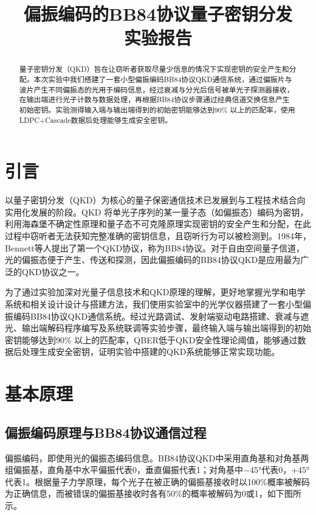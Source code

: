 \documentclass[UTF8]{ctexart}
\title{\vspace{-2em}\heiti 偏振编码的BB84协议量子密钥分发\\实验报告}
\date{}
\begin{document}
\maketitle

\begin{abstract}

量子密钥分发（QKD）旨在让窃听者获取尽量少信息的情况下实现密钥的安全产生和分配。本次实验中我们搭建了一套小型偏振编码BB84协议QKD通信系统，通过偏振片与波片产生不同偏振态的光用于编码信息，经过衰减与分光后信号被单光子探测器接收，在输出端进行光子计数与数据处理，再根据BB84协议步骤通过经典信道交换信息产生初始密钥。实验测得输入端与输出端得到的初始密钥能够达到90\% 以上的匹配率，使用LDPC+Cascade数据后处理能够生成安全密钥。

\end{abstract}

\section{引言}

以量子密钥分发（QKD）为核心的量子保密通信技术已发展到与工程技术结合向实用化发展的阶段。QKD 将单光子序列的某一量子态（如偏振态）编码为密钥，利用海森堡不确定性原理和量子态不可克隆原理实现密钥的安全产生和分配，在此过程中窃听者无法获知完整准确的密钥信息，且窃听行为可以被检测到。1984年，Bennett等人提出了第一个QKD协议，称为BB84协议。对于自由空间量子信道，光的偏振态便于产生、传送和探测，因此偏振编码的BB84协议QKD是应用最为广泛的QKD协议之一。

为了通过实验加深对光量子信息技术和QKD原理的理解，更好地掌握光学和电学系统和相关设计设计与搭建方法，我们使用实验室中的光学仪器搭建了一套小型偏振编码BB84协议QKD通信系统。经过光路调试、发射端驱动电路搭建、衰减与遮光、输出端解码程序编写及系统联调等实验步骤，最终输入端与输出端得到的初始密钥能够达到90\% 以上的匹配率，QBER低于QKD安全性理论阈值，能够通过数据后处理生成安全密钥，证明实验中搭建的QKD系统能够正常实现功能。

\section{基本原理}

\subsection{偏振编码原理与BB84协议通信过程}

偏振编码，即使用光的偏振态编码信息。BB84协议QKD中采用直角基和对角基两组偏振基，直角基中水平偏振代表0，垂直偏振代表1；对角基中$-\ang{45}$代表0，$+\ang{45}$代表1。根据量子力学原理，每个光子在被正确的偏振基接收时以100\%概率被解码为正确信息，而被错误的偏振基接收时各有50\%的概率被解码为0或1，如下图所示。
\end{document}
